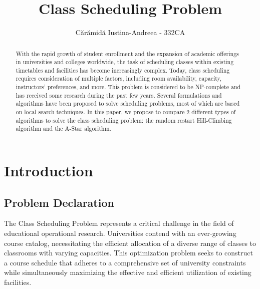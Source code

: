 \documentclass[runningheads]{paper}
\begin{document}
%
\title{Class Scheduling Problem}
%
\author{Cărămidă Iustina-Andreea - 332CA}
%
%
\maketitle              %
%
\begin{abstract}
    With the rapid growth of student enrollment and the expansion of academic 
    offerings in universities and colleges worldwide, the task of scheduling 
    classes within existing timetables and facilities has become increasingly 
    complex. Today, class scheduling requires consideration of multiple factors, 
    including room availability, capacity, instructors' preferences, and more. This problem is considered to be 
    NP-complete and has received some research during the past few years. 
    Several formulations and algorithms have been proposed to solve scheduling
    problems, most of which are based on local search techniques. In this paper, 
    we propose to compare 2 different types of algorithms to solve the class
    scheduling problem: the random restart Hill-Climbing algorithm and the A-Star algorithm.

\end{abstract}

\pagebreak
\section{Introduction}
\subsection{Problem Declaration}

\quad The Class Scheduling Problem represents a critical challenge in the field 
of educational operational research.  Universities contend with an ever-growing 
course catalog, necessitating the efficient allocation of a diverse range of 
classes to classrooms with varying capacities. This optimization problem seeks 
to construct a course schedule that adheres to a comprehensive set of university 
constraints while simultaneously maximizing the effective and efficient 
utilization of existing facilities.
\end{document}
